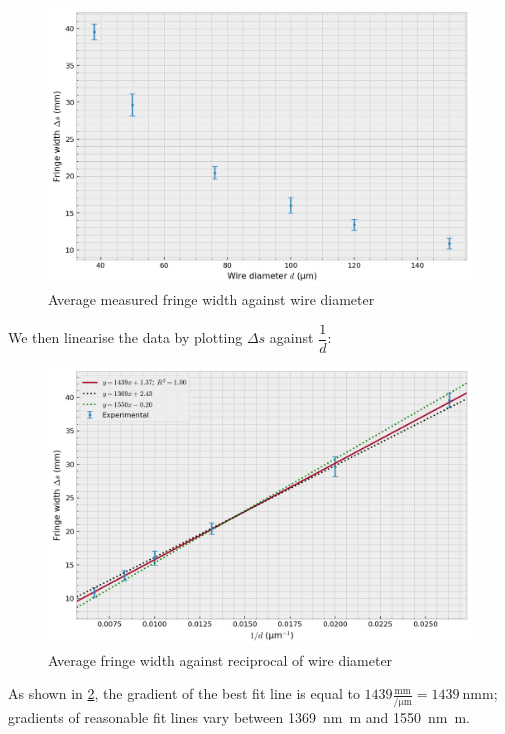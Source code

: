 \documentclass[a4paper, 12pt]{article}
\begin{document}
\begin{figure}[H]
    \centering
    \includegraphics[width=\textwidth]{scripts/processed-data/ds_vs_d}
    \caption{Average measured fringe width against wire diameter}
    \label{fig:ds_vs_d}
\end{figure}

We then linearise the data by plotting $\Delta s$ against $\dfrac{1}{d}$:

\begin{figure}[H]
    \centering
    \includegraphics[width=\textwidth]{scripts/processed-data/ds_vs_d_lin}
    \caption{Average fringe width against reciprocal of wire diameter} 
    \label{fig:ds_vs_d_lin}
\end{figure}

As shown in \cref{fig:ds_vs_d_lin}, the gradient of the best fit line is equal to $1439 \frac{\si{\mm}}{\si{\per\um}} = \SI{1439}{\nm \m}$; 
gradients of reasonable fit lines vary between \SI{1369}{\nm \m} and \SI{1550}{\nm \m}.
\end{document}
